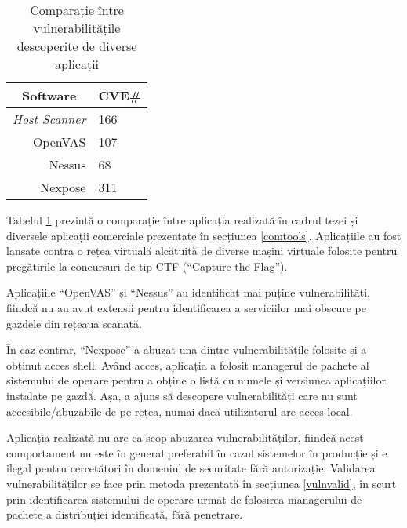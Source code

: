 	\begin{table}[H]
		\centering
		\begin{tabular}{|r|l|}
			\hline
			\multicolumn{1}{|c|}{\textbf{Software}} & \multicolumn{1}{c|}{\textbf{CVE\#}} \\ \hline
			\textit{Host Scanner\footnotemark{}}                   & 166                                 \\
			OpenVAS                                 & 107                                 \\
			Nessus                                  & 68                                  \\
			Nexpose                                 & 311                                 \\ \hline
		\end{tabular}
		\caption{Comparație între vulnerabilitățile descoperite de diverse aplicații}
		\label{foundvulns_ro}
	\end{table}
	
	Tabelul \ref{foundvulns_ro} prezintă o comparație între aplicația realizată în cadrul tezei și diversele aplicații comerciale prezentate în secțiunea \ref{comtools}. Aplicațiile au fost lansate contra o rețea virtuală alcătuită de diverse mașini virtuale folosite pentru pregătirile la concursuri de tip CTF (``Capture the Flag'').
	
	Aplicațiile ``OpenVAS'' și ``Nessus'' au identificat mai puține vulnerabilități, fiindcă nu au avut extensii pentru identificarea a serviciilor mai obscure pe gazdele din rețeaua scanată.
	
	În caz contrar, ``Nexpose'' a abuzat una dintre vulnerabilitățile folosite și a obținut acces shell. Având acces, aplicația a folosit managerul de pachete al sistemului de operare pentru a obține o listă cu numele și versiunea aplicațiilor instalate pe gazdă. Așa, a ajuns să descopere vulnerabilități care nu sunt accesibile/abuzabile de pe rețea, numai dacă utilizatorul are acces local.
	
	Aplicația realizată nu are ca scop abuzarea vulnerabilităților, fiindcă acest comportament nu este în general preferabil în cazul sistemelor în producție și e ilegal pentru cercetători în domeniul de securitate fără autorizație. Validarea vulnerabilităților se face prin metoda prezentată în secțiunea \ref{vulnvalid}, în scurt prin identificarea sistemului de operare urmat de folosirea managerului de pachete a distribuției identificată, fără penetrare.
